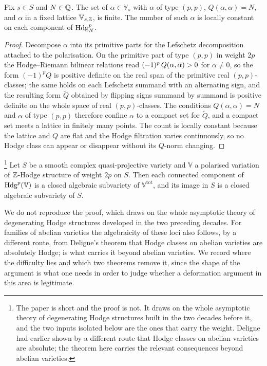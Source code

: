 \begin{lemma}\label{lem:boundednorm}
Fix $s\in S$ and $N\in\mathbb{Q}$. The set of $\alpha\in\mathbb{V}_{s}$ with
$\alpha$ of type $(p,p)$, $Q(\alpha,\alpha)=N$, and $\alpha$ in a fixed
lattice $\mathbb{V}_{s,\mathbb{Z}}$, is finite. The number of such $\alpha$ is locally
constant on each component of $\mathrm{Hdg}^{p}_{N}$.
\end{lemma}

\begin{proof}
Decompose $\alpha$ into its primitive parts for the Lefschetz decomposition
attached to the polarisation. On the primitive part of type $(p,p)$ in weight
$2p$ the Hodge--Riemann bilinear relations read
$(-1)^{p}\,Q(\alpha,\overline{\alpha})>0$ for $\alpha\ne0$, so the form
$(-1)^{p}Q$ is positive definite on the real span of the primitive real
$(p,p)$-classes; the same holds on each Lefschetz summand with an alternating
sign, and the resulting form $\tilde Q$ obtained by flipping signs summand by
summand is positive definite on the whole space of real $(p,p)$-classes. The
conditions $Q(\alpha,\alpha)=N$ and $\alpha$ of type $(p,p)$ therefore confine
$\alpha$ to a compact set for $\tilde Q$, and a compact set meets a lattice in
finitely many points. The count is locally constant because the lattice and $Q$
are flat and the Hodge filtration varies continuously, so no Hodge class can
appear or disappear without its $Q$-norm changing.
\end{proof}

\begin{theorem}\label{thm:cdk}%
\footnote{The paper is short and the proof is not. It draws on the whole
asymptotic theory of degenerating Hodge structures built in the two decades
before it, and the two inputs isolated below are the ones that carry the
weight. Deligne had earlier shown by a different route that Hodge classes on
abelian varieties are absolute; the theorem here carries the relevant
consequences beyond abelian varieties.}
Let $S$ be a smooth complex quasi-projective variety and $\mathbb{V}$ a
polarised variation of $\mathbb{Z}$-Hodge structure of weight $2p$ on $S$. Then each
connected component of $\mathrm{Hdg}^{p}(\mathbb{V})$ is a closed algebraic subvariety
of $\mathbb{V}^{\mathrm{tot}}$, and its image in $S$ is a closed algebraic
subvariety of $S$.
\end{theorem}

We do not reproduce the proof, which draws on the whole asymptotic theory of
degenerating Hodge structures developed in the two preceding decades. For
families of abelian varieties the algebraicity of these loci also follows, by
a different route, from Deligne's theorem that Hodge classes on abelian
varieties are absolutely Hodge;  is what carries it beyond
abelian varieties. We record where the difficulty lies and which two
theorems remove it, since the shape of the argument is what one needs in
order to judge whether a deformation argument in this area is legitimate.

